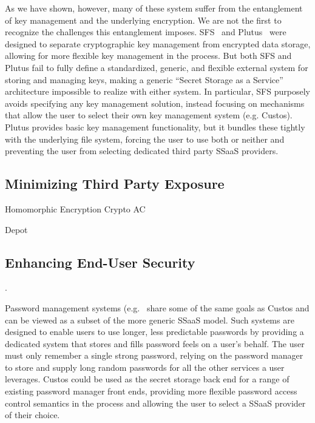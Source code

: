 As we have shown, however, many
of these system suffer from the entanglement of key management and the
underlying encryption. We are not the first to recognize the
challenges this entanglement imposes. SFS~\cite{Mazieres1999} and
Plutus~\cite{Kallahalla2003} were designed to separate cryptographic
key management from encrypted data storage, allowing for more flexible
key management in the process. But both SFS and Plutus fail to fully
define a standardized, generic, and flexible external system for
storing and managing keys, making a generic ``Secret Storage as a
Service'' architecture impossible to realize with either system. In
particular, SFS purposely avoids specifying any key management
solution, instead focusing on mechanisms that allow the user to select
their own key management system (e.g. Custos). Plutus provides basic
key management functionality, but it bundles these tightly with the
underlying file system, forcing the user to use both or neither and
preventing the user from selecting dedicated third party SSaaS
providers.

\subsection{Minimizing Third Party Exposure}

Homomorphic Encryption
Crypto AC

Depot~\cite{Mahajan2011}

\subsection{Enhancing End-User Security}
\cite{openpgp, pgp, gnupg}
\cite{enigmail, mailpile, Koch2011}
\cite{lastpass, onepassword, apple-icloud}
\cite{schneier-passwords, krebs-passwords, brodkin-passman}.
\cite{spideroak}

Password management systems (e.g.~\cite{lastpass} share some of the
same goals as Custos and can be viewed as a subset of the more generic
SSaaS model. Such systems are designed to enable users to use longer,
less predictable passwords by providing a dedicated system that stores
and fills password feels on a user's behalf. The user must only
remember a single strong password, relying on the password manager to
store and supply long random passwords for all the other services a
user leverages. Custos could be used as the secret storage back end
for a range of existing password manager front ends, providing more
flexible password access control semantics in the process and allowing
the user to select a SSaaS provider of their choice.


